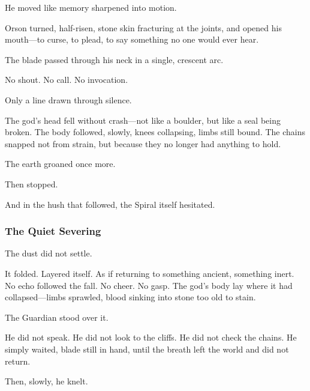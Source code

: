 \documentclass[12pt]{article}
\begin{document}
\vspace{0.5em}
He moved like memory sharpened into motion.

\vspace{0.5em}
Orson turned, half-risen, stone skin fracturing at the joints, and opened his mouth---to curse, to plead, to say something no one would ever hear.

\vspace{0.5em}
The blade passed through his neck in a single, crescent arc.

\vspace{0.5em}
No shout. No call. No invocation.

\vspace{0.5em}
Only a line drawn through silence.

\vspace{0.5em}
The god’s head fell without crash---not like a boulder, but like a seal being broken. The body followed, slowly, knees collapsing, limbs still bound. The chains snapped not from strain, but because they no longer had anything to hold.

\vspace{0.5em}
The earth groaned once more.

\vspace{0.5em}
Then stopped.

\vspace{0.5em}
And in the hush that followed, the Spiral itself hesitated.


\dotfill

\subsubsection{The Quiet Severing}

The dust did not settle.

\vspace{0.5em}
It folded. Layered itself. As if returning to something ancient, something inert. No echo followed the fall. No cheer. No gasp. The god’s body lay where it had collapsed---limbs sprawled, blood sinking into stone too old to stain.

\vspace{0.5em}
The Guardian stood over it.

\vspace{0.5em}
He did not speak. He did not look to the cliffs. He did not check the chains. He simply waited, blade still in hand, until the breath left the world and did not return.

\vspace{0.5em}
Then, slowly, he knelt.
\end{document}
